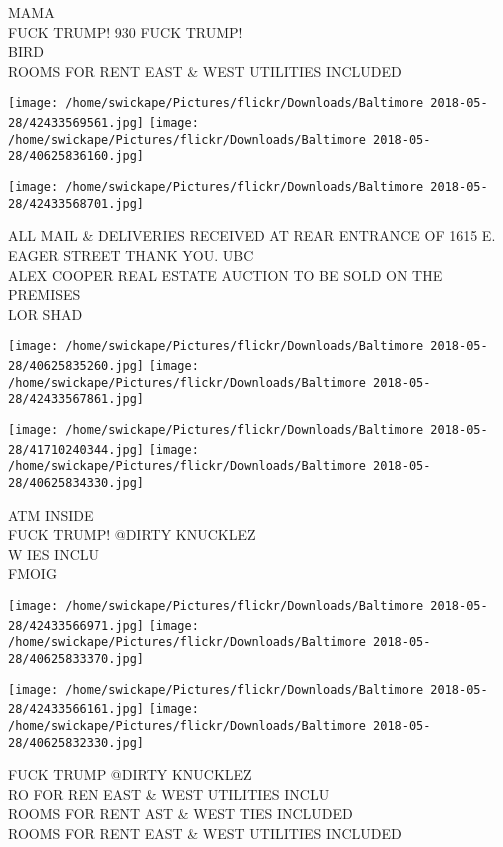 \documentclass[10pt,letterpaper]{article}
\begin{document}
MAMA\\
FUCK TRUMP!  930 FUCK TRUMP!\\
BIRD\\
ROOMS FOR RENT EAST \& WEST UTILITIES INCLUDED\\
\pagebreak

\texttt{[image: /home/swickape/Pictures/flickr/Downloads/Baltimore 2018-05-28/42433569561.jpg]}
\texttt{[image: /home/swickape/Pictures/flickr/Downloads/Baltimore 2018-05-28/40625836160.jpg]}

\vspace{0.25in}
\texttt{[image: /home/swickape/Pictures/flickr/Downloads/Baltimore 2018-05-28/42433568701.jpg]}

ALL MAIL \& DELIVERIES RECEIVED AT REAR ENTRANCE OF 1615 E. EAGER STREET THANK YOU. UBC\\
ALEX COOPER REAL ESTATE AUCTION TO BE SOLD ON THE PREMISES\\
LOR SHAD\\
\pagebreak

\texttt{[image: /home/swickape/Pictures/flickr/Downloads/Baltimore 2018-05-28/40625835260.jpg]}
\texttt{[image: /home/swickape/Pictures/flickr/Downloads/Baltimore 2018-05-28/42433567861.jpg]}

\texttt{[image: /home/swickape/Pictures/flickr/Downloads/Baltimore 2018-05-28/41710240344.jpg]}
\texttt{[image: /home/swickape/Pictures/flickr/Downloads/Baltimore 2018-05-28/40625834330.jpg]}

ATM INSIDE\\
FUCK TRUMP!  @DIRTY KNUCKLEZ\\
W IES INCLU\\
FMOIG\\
\pagebreak

\texttt{[image: /home/swickape/Pictures/flickr/Downloads/Baltimore 2018-05-28/42433566971.jpg]}
\texttt{[image: /home/swickape/Pictures/flickr/Downloads/Baltimore 2018-05-28/40625833370.jpg]}

\texttt{[image: /home/swickape/Pictures/flickr/Downloads/Baltimore 2018-05-28/42433566161.jpg]}
\texttt{[image: /home/swickape/Pictures/flickr/Downloads/Baltimore 2018-05-28/40625832330.jpg]}

FUCK TRUMP @DIRTY KNUCKLEZ\\
RO FOR REN EAST \& WEST UTILITIES INCLU\\
ROOMS FOR RENT AST \& WEST TIES INCLUDED\\
ROOMS FOR RENT EAST \& WEST UTILITIES INCLUDED\\
\pagebreak
\end{document}
